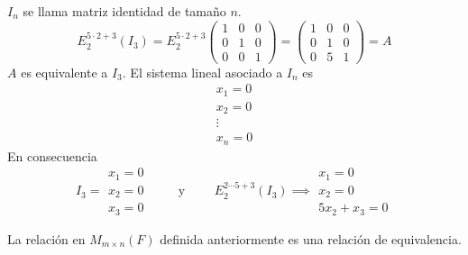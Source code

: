 \documentclass[12pt,a4paper]{book}
\begin{document}
    \begin{ejemplo}
        $I_{n}$ se llama matriz identidad de tamaño $n$.
        \begin{equation*}
            E_{2}^{5\cdot2+3}(I_{3})=E_{2}^{5\cdot2+3}
            \begin{pmatrix}
                1 & 0 & 0\\
                0 & 1 & 0\\
                0 & 0 & 1
            \end{pmatrix}
            =
            \begin{pmatrix}
                1 & 0 & 0\\
                0 & 1 & 0\\
                0 & 5 & 1
            \end{pmatrix}
            =A
        \end{equation*}
        $A$ es equivalente a $I_{3}$. El sistema lineal asociado a $I_{n}$ es
        \begin{equation*}
            \begin{matrix}
                x_{1}=0\\
                x_{2}=0\\
                \vdots\\
                x_{n}=0
            \end{matrix}
        \end{equation*}
        En consecuencia
        \begin{equation*}
            I_{3}=
            \begin{matrix}
                x_{1}=0\\
                x_{2}=0\\
                x_{3}=0
            \end{matrix}
            \qquad
            \text{ y }
            \qquad
            E_{2}^{2\cdots5+3}(I_{3})\implies
            \begin{matrix}
                x_{1}=0\\
                x_{2}=0\\
                5x_{2}+x_{3}=0
            \end{matrix}
        \end{equation*}
    \end{ejemplo}
    

    \begin{proposicion}
        La relación en $M_{m\times n}(F)$ definida anteriormente es una relación de equivalencia.
    \end{proposicion}
\end{document}
